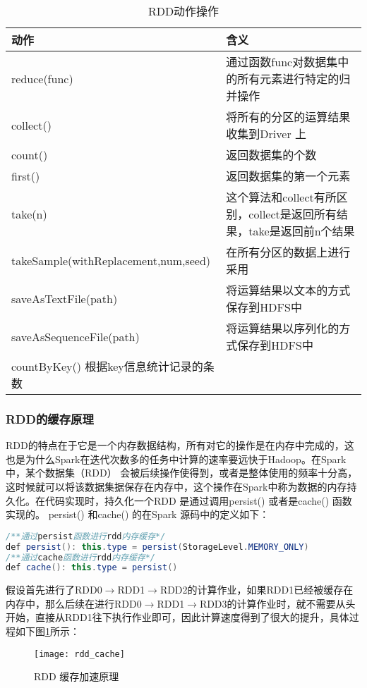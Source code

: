 \begin{table}[h] %
\caption{RDD动作操作} %
\centering
\label{tab:action}
\begin{tabular}{p{6cm}|p{8cm}} %
\hline
\hline
动作  & 含义 \\ %
\hline %
reduce(func)  & 通过函数func对数据集中的所有元素进行特定的归并操作\\
\hline
collect()  & 将所有的分区的运算结果收集到Driver 上\\
\hline
count()  & 返回数据集的个数\\
\hline
first() & 返回数据集的第一个元素\\
\hline
take(n) & 这个算法和collect有所区别，collect是返回所有结果，take是返回前n个结果\\
\hline
takeSample(withReplacement,num,seed) & 在所有分区的数据上进行采用\\
\hline
saveAsTextFile(path) & 将运算结果以文本的方式保存到HDFS中\\
\hline
saveAsSequenceFile(path) & 将运算结果以序列化的方式保存到HDFS中\\
\hline
countByKey() 根据key信息统计记录的条数\\
\hline
\hline
\end{tabular}
\end{table}

\subsubsection{RDD的缓存原理}
RDD的特点在于它是一个内存数据结构，所有对它的操作是在内存中完成的，这也是为什么Spark在迭代次数多的任务中计算的速率要远快于Hadoop。在Spark中，某个数据集（RDD） 会被后续操作使得到，或者是整体使用的频率十分高，这时候就可以将该数据集据保存在内存中，这个操作在Spark中称为数据的内存持久化。在代码实现时，持久化一个RDD 是通过调用persist() 或者是cache() 函数实现的。 persist() 和cache() 的在Spark 源码中的定义如下：
\begin{lstlisting}[language=Java,numbers=none,frame=none]
/**通过persist函数进行rdd内存缓存*/
def persist(): this.type = persist(StorageLevel.MEMORY_ONLY)
/**通过cache函数进行rdd内存缓存*/
def cache(): this.type = persist()
\end{lstlisting}

假设首先进行了RDD0$\rightarrow$RDD1$\rightarrow$RDD2的计算作业，如果RDD1已经被缓存在内存中，那么后续在进行RDD0$\rightarrow$RDD1$\rightarrow$RDD3的计算作业时，就不需要从头开始，直接从RDD1往下执行作业即可，因此计算速度得到了很大的提升，具体过程如下图\ref{fig:rdd_cache}所示：
\begin{figure}[htp]
\centering
\texttt{[image: rdd\_cache]}
\caption{RDD 缓存加速原理}
\label{fig:rdd_cache}
\end{figure}

